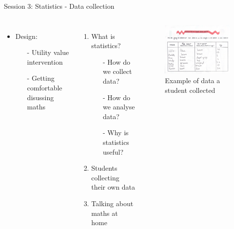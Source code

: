 \documentclass{beamer}  %
\begin{document}
\begin{frame}{Session 3: Statistics - Data collection}
    \begin{columns}
            \begin{itemize}
                \item Design:
                \begin{itemize}
                    \item[-] Utility value intervention
                    \item[-] Getting comfortable disussing maths
                \end{itemize}
            \end{itemize}
            \begin{enumerate}
                \item What is statistics?
                \begin{itemize}
                    \item[-] How do we collect data?
                    \item[-] How do we analyse data?
                    \item[-] Why is statistics useful?
                \end{itemize}
                \item Students collecting their own data         
                \item Talking about maths at home
            \end{enumerate}
            \begin{figure}
                \includegraphics[scale = 0.49]{Images/Collecting_data_example.png}
                \caption{Example of data a student collected}
            \end{figure}
    \end{columns}
        
\end{frame}
\end{document}

